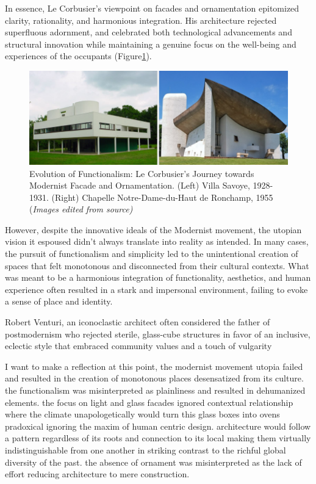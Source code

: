 In essence, Le Corbusier's viewpoint on facades and ornamentation epitomized clarity, rationality, and harmonious integration.
His architecture rejected superfluous adornment, and celebrated both technological advancements and structural innovation while maintaining a genuine focus on the well-being and experiences of the occupants (Figure\ref{fig:Modernistfacade}).

     \begin{figure}[htb]
          \centering
          \includegraphics[width= \linewidth]{Images/ModernistFacade}
          \caption{Evolution of Functionalism: Le Corbusier's Journey towards Modernist Facade and Ornamentation. (Left) Villa Savoye, 1928-1931. (Right) Chapelle Notre-Dame-du-Haut de Ronchamp, 1955 (\textit{Images edited from source)}}
          \label{fig:Modernistfacade}
        \end{figure}



However, despite the innovative ideals of the Modernist movement, the utopian vision it espoused didn't always translate into reality as intended.
In many cases, the pursuit of functionalism and simplicity led to the unintentional creation of spaces that felt monotonous and disconnected from their cultural contexts.
What was meant to be a harmonious integration of functionality, aesthetics, and human experience often resulted in a stark and impersonal environment, failing to evoke a sense of place and identity.

Robert Venturi, an iconoclastic architect often considered the father of postmodernism who rejected sterile, glass-cube structures in favor of an inclusive, eclectic style that embraced community values and a touch of vulgarity\cite{Schudel2018}

I want to make a reflection at this point, the modernist movement utopia failed and resulted in the creation of monotonous places desensatized from its culture.
the functionalism was misinterpreted as plainliness and resulted in dehumanized elements.
the focus on light and glass facades ignored contextual relationship where the climate unapologetically would turn this glass boxes into ovens pradoxical ignoring the maxim of human centric design.
architecture would follow a pattern regardless of its roots and connection to its local making them virtually indistinguishable from one another in striking contrast to the richful global diversity of the past.
the absence of ornament was misinterpreted as the lack of effort reducing architecture to mere construction.
    
